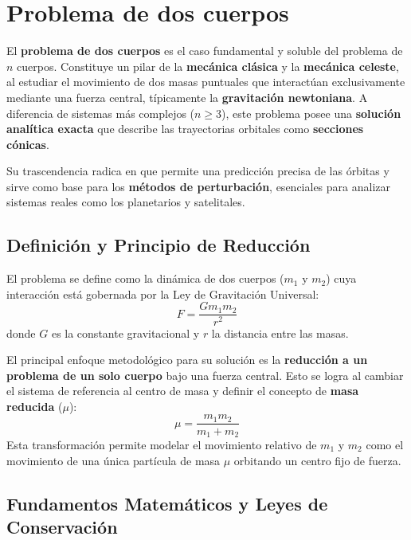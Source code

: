\section{Problema de dos cuerpos}
\label{sec:two-body_problem}

El \textbf{problema de dos cuerpos} es el caso fundamental y soluble del problema de $n$ cuerpos. Constituye un pilar de la \textbf{mecánica clásica} y la \textbf{mecánica celeste}, al estudiar el movimiento de dos masas puntuales que interactúan exclusivamente mediante una fuerza central, típicamente la \textbf{gravitación newtoniana}. A diferencia de sistemas más complejos ($n \ge 3$), este problema posee una \textbf{solución analítica exacta} que describe las trayectorias orbitales como \textbf{secciones cónicas}.

Su trascendencia radica en que permite una predicción precisa de las órbitas y sirve como base para los \textbf{métodos de perturbación}, esenciales para analizar sistemas reales como los planetarios y satelitales.

\subsection{Definición y Principio de Reducción}
\label{subsec:definicion_dos_cuerpos}

El problema se define como la dinámica de dos cuerpos ($m_1$ y $m_2$) cuya interacción está gobernada por la Ley de Gravitación Universal:
\begin{equation}
    F = \frac{G m_1 m_2}{r^2}
\end{equation}
donde \(G\) es la constante gravitacional y \(r\) la distancia entre las masas.

El principal enfoque metodológico para su solución es la \textbf{reducción a un problema de un solo cuerpo} bajo una fuerza central. Esto se logra al cambiar el sistema de referencia al centro de masa y definir el concepto de \textbf{masa reducida} ($\mu$):
\begin{equation}
    \mu = \frac{m_1 m_2}{m_1 + m_2}
\end{equation}
Esta transformación permite modelar el movimiento relativo de $m_1$ y $m_2$ como el movimiento de una única partícula de masa $\mu$ orbitando un centro fijo de fuerza.

\subsection{Fundamentos Matemáticos y Leyes de Conservación}
\label{subsec:fundamentos_matematicos_dos_cuerpos}


